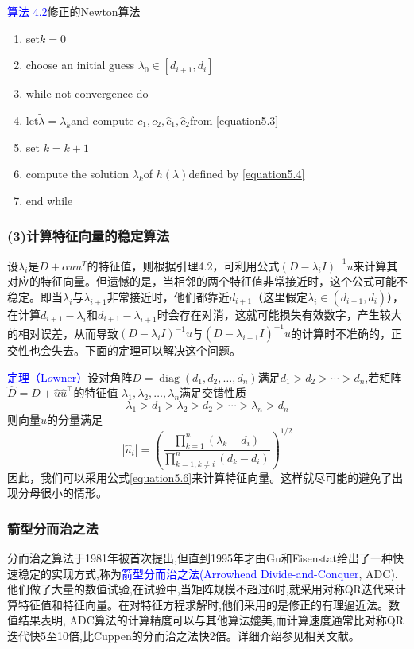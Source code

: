 \documentclass[notheorems,serif]{beamer}
\begin{document}
\begin{frame}
\textcolor{blue}{算法 4.2}\quad 修正的Newton算法
\begin{enumerate}[1:]
	\item set$k=0$
	\item choose an initial guess $\lambda _0\in [d_{i+1},d_i]$
	\item while not convergence do
	\item \quad let$\tilde{\lambda}=\lambda _k$and compute $c_1,c_2,\hat{c}_{1},\hat{c}_{2}$from \ref{equation5.3}
	\item \quad set $k=k+1$
	\item \quad compute the solution $\lambda _k$of $h(\lambda)$defined by \ref{equation5.4}
	\item end while
\end{enumerate}
\end{frame}
\begin{frame}
\frametitle{(3)计算特征向量的稳定算法}


设$\lambda_i$是$D+\alpha uu^T$的特征值，则根据引理4.2，可利用公式$\left(D-\lambda_{i} I\right)^{-1} u$来计算其对应的特征向量。但遗憾的是，当相邻的两个特征值非常接近时，这个公式可能不稳定。即当$\lambda_i$与$\lambda_{i+1}$非常接近时，他们都靠近$d_{i+1}$（这里假定$\lambda_{i} \in\left(d_{i+1}, d_{i}\right)$），在计算$d_{i+1}-\lambda_{i}$和$d_{i+1}-\lambda_{i+1}$时会存在对消，这就可能损失有效数字，产生较大的相对误差，从而导致$\left(D-\lambda_{i} I\right)^{-1} u$与$\left(D-\lambda_{i+1} I\right)^{-1} u$的计算时不准确的，正交性也会失去。下面的定理可以解决这个问题。
\end{frame}
\begin{frame}

\textcolor{blue}{定理（L$\ddot{o}$wner）}\quad 设对角阵$D=\operatorname{diag}\left(d_{1}, d_{2}, \dots, d_{n}\right)$满足$d_{1}>d_{2}>\cdots>d_n$,若矩阵$\hat{D}=D+\hat{u} \hat{u}^{\top}$的特征值
$\lambda_{1}, \lambda_{2}, \ldots, \lambda_{n}$满足交错性质\begin{equation}
\lambda_{1}>d_{1}>\lambda_{2}>d_{2}>\cdots>\lambda_{n}>d_{n}
\label{equation5.5}
\end{equation}
则向量$\hat{u}$的分量满足\begin{equation}
\left|\hat{u}_{i}\right|=\left(\frac{\prod_{k=1}^{n}\left(\lambda_{k}-d_{i}\right)}{\prod_{k=1, k \neq i}^{n}\left(d_{k}-d_{i}\right)}\right)^{1 / 2}
\label{equation5.6}
\end{equation}
因此，我们可以采用公式\ref{equation5.6}来计算特征向量。这样就尽可能的避免了出现分母很小的情形。\\
\end{frame}
\begin{frame}
\frametitle{箭型分而治之法}


分而治之算法于1981年被首次提出,但直到1995年才由Gu和Eisenstat给出了一种快速稳定的实现方式,称为\textcolor{blue}{箭型分而治之法(Arrowhead Divide-and-Conquer}, ADC).他们做了大量的数值试验,在试验中,当矩阵规模不超过6时,就采用对称QR迭代来计算特征值和特征向量。在对特征方程求解时,他们采用的是修正的有理逼近法。数值结果表明, ADC算法的计算精度可以与其他算法媲美,而计算速度通常比对称QR迭代快5至10倍,比Cuppen的分而治之法快2倍。详细介绍参见相关文献。

\end{frame}
\end{document}
